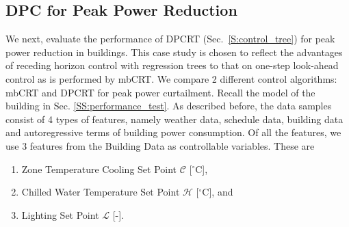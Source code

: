 \subsection{DPC for Peak Power Reduction}
\label{SS:case_dpc}
We next, evaluate the performance of DPCRT (Sec.~\ref{S:control_tree}) for peak power reduction in buildings. This case study is chosen to reflect the advantages of receding horizon control with regression trees to that on one-step look-ahead control as is performed by mbCRT. 
We compare 2 different control algorithms: mbCRT \cite{BehlJainMangharam2016} and DPCRT for peak power curtailment. Recall the model of the building in Sec. \ref{SS:performance_test}. As described before, the data samples consist of 4 types of features, namely weather data, schedule data, building data and autoregressive terms of building power consumption. Of all the features, we use 3 features from the Building Data as controllable variables. These are 
\begin{enumerate}[leftmargin=0.5cm,topsep=1pt,itemsep=-1ex,partopsep=1ex,parsep=1ex]
\item Zone Temperature Cooling Set Point $\mathcal{C}$ [$^{\circ}$C],
\item Chilled Water Temperature Set Point $\mathcal{H}$ [$^{\circ}$C], and
\item Lighting Set Point $\mathcal{L}$ [-].
\end{enumerate}
